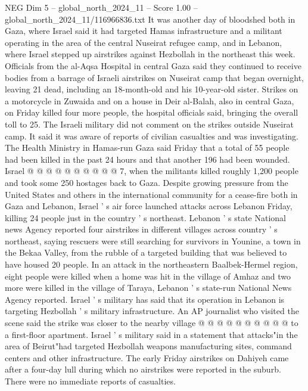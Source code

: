 \begin{textsample}{NEG Dim 5 – global\_north\_2024\_11 – Score 1.00 – global\_north\_2024\_11/116966836.txt}  \label{ex:f5_neg_428}
It was another day of bloodshed both in Gaza, where Israel said it had targeted Hamas infrastructure and a militant operating in the area of the central Nuseirat refugee camp, and in Lebanon, where Israel stepped up airstrikes against Hezbollah in the northeast this week.
Officials from the al-Aqsa Hospital in central Gaza said they continued to receive bodies from a barrage of Israeli airstrikes on Nuseirat camp that began overnight, leaving 21 dead, including an 18-month-old and his 10-year-old sister.
Strikes on a motorcycle in Zuwaida and on a house in Deir al-Balah, also in central Gaza, on Friday killed four more people, the hospital officials said, bringing the overall toll to 25.
The Israeli military did not comment on the strikes outside Nuseirat camp.
It said it was aware of reports of civilian casualties and was investigating.
The Health Ministry in Hamas-run Gaza said Friday that a total of 55 people had been killed in the past 24 hours and that another 196 had been wounded.
Israel @ @ @ @ @ @ @ @ @ @ 7, when the militants killed roughly 1,200 people and took some 250 hostages back to Gaza.
Despite growing pressure from the United States and others in the international community for a cease-fire both in Gaza and Lebanon, Israel ' s air force launched attacks across Lebanon Friday, killing 24 people just in the country ' s northeast.
Lebanon ' s state National news Agency reported four airstrikes in different villages across country ' s northeast, saying rescuers were still searching for survivors in Younine, a town in the Bekaa Valley, from the rubble of a targeted building that was believed to have housed 20 people.
In an attack in the northeastern Baalbek-Hermel region, eight people were killed when a home was hit in the village of Amhaz and two more were killed in the village of Taraya, Lebanon ' s state-run National News Agency reported.
Israel ' s military has said that its operation in Lebanon is targeting Hezbollah ' s military infrastructure.
An AP journalist who visited the scene said the strike was closer to the nearby village @ @ @ @ @ @ @ @ @ @ to a first-floor apartment.
Israel ' s military said in a statement that attacks"in the area of Beirut"had targeted Hezbollah weapons manufacturing sites, command centers and other infrastructure.
The early Friday airstrikes on Dahiyeh came after a four-day lull during which no airstrikes were reported in the suburb.
There were no immediate reports of casualties.

\end{textsample}
